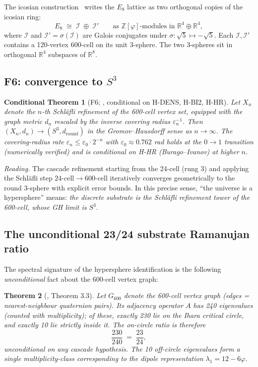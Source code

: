 \documentclass[11pt]{article}
\theoremstyle{plain}
\newtheorem{theorem}{Theorem}[section]
\newtheorem{conditional}[theorem]{Conditional Theorem}
\theoremstyle{definition}
\theoremstyle{remark}
\newcommand{\Zphi}{\mathbb{Z}[\varphi]}
\newcommand{\Ical}{\mathcal{I}}
\begin{document}
The icosian construction~\citep{Elkies1990, ConwaySloane} writes the $E_8$ lattice as two orthogonal copies of the icosian ring:
\[
  E_8 \;\cong\; \Ical \;\oplus\; \Ical'  \qquad \text{as $\Zphi$-modules in } \mathbb{R}^4 \oplus \mathbb{R}^4,
\]
where $\Ical$ and $\Ical' = \sigma(\Ical)$ are Galois conjugates under $\sigma: \sqrt 5 \mapsto -\sqrt 5$. Each $\Ical, \Ical'$ contains a 120-vertex 600-cell on its unit 3-sphere. The two 3-spheres sit in orthogonal $\mathbb{R}^4$ subspaces of $\mathbb{R}^8$.

\subsection{F6: convergence to $S^3$}

\begin{conditional}[F6; \citealp{SmartXXXVI}, conditional on H-DENS, H-BI2, H-HR]\label{thm:F6}
Let $X_n$ denote the $n$-th Schl\"afli refinement of the 600-cell vertex set, equipped with the graph metric $d_n$ rescaled by the inverse covering radius $\varepsilon_n^{-1}$. Then $(X_n, d_n) \to (S^3, d_\mathrm{round})$ in the Gromov--Hausdorff sense as $n \to \infty$. The covering-radius rate $\varepsilon_n \le \varepsilon_0 \cdot 2^{-n}$ with $\varepsilon_0 \approx 0.762$ rad holds at the $0 \to 1$ transition (numerically verified) and is conditional on H-HR (Burago--Ivanov) at higher $n$.
\end{conditional}

\noindent\emph{Reading.} The cascade refinement starting from the 24-cell (rung 3) and applying the Schl\"afli step $24\text{-cell} \to 600\text{-cell}$ iteratively converges geometrically to the round 3-sphere with explicit error bounds. In this precise sense, ``the universe is a hypersphere'' means: \emph{the discrete substrate is the Schl\"afli refinement tower of the 600-cell, whose GH limit is $S^3$}.

\subsection{The unconditional 23/24 substrate Ramanujan ratio}

The spectral signature of the hypersphere identification is the following \emph{unconditional} fact about the 600-cell vertex graph:

\begin{theorem}[\citealp{rhTwoSphere}, Theorem 3.3]\label{thm:23-24}
Let $G_{600}$ denote the 600-cell vertex graph (edges = nearest-neighbour quaternion pairs). Its adjacency operator $A$ has 240 eigenvalues (counted with multiplicity); of these, exactly 230 lie on the Ihara critical circle, and exactly 10 lie strictly inside it. The on-circle ratio is therefore
\[
  \frac{230}{240} \;=\; \frac{23}{24},
\]
\emph{unconditional} on any cascade hypothesis. The 10 off-circle eigenvalues form a single multiplicity-class corresponding to the dipole representation $\lambda_1 = 12 - 6\varphi$.
\end{theorem}
\end{document}
